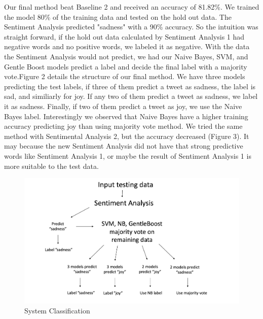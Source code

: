 \documentclass[]{article}
\begin{document}
Our final method beat Baseline 2 and received an accuracy of 81.82\%. We trained the model 80\% of the training data and tested on the hold out data. The Sentiment Analysis predicted "sadness" with a 90\% accuracy. So the intuition was straight forward, if the hold out data calculated by Sentiment Analysis 1 had negative words and no positive words, we labeled it as negative. With the data the Sentiment Analysis would not predict, we had our Naive Bayes, SVM, and Gentle Boost models predict a label and decide the final label with a majority vote.Figure 2 details the structure of our final method. We have three models predicting the test labels, if three of them  predict a tweet as sadness, the label is sad, and similiarly for joy. If any two of them predict a tweet as sadness, we label it as sadness. Finally, if two of them predict a tweet as joy, we use the Naive Bayes label. Interestingly we observed that Naive Bayes have a higher training accuracy predicting joy than using majority vote method. We tried the same method with Sentimental Analysis 2, but the accuracy decreased (Figure 3). It may because the new Sentiment Analysis did not have that strong predictive words like Sentiment Analysis 1, or maybe the result of Sentiment Analysis 1 is more suitable to the test data.


\begin{figure}
	\centering
  \includegraphics[scale=0.35]{Method.jpg}
  \caption{System Classification}
  \label{fig:System Classification}
\end{figure}
\end{document}
